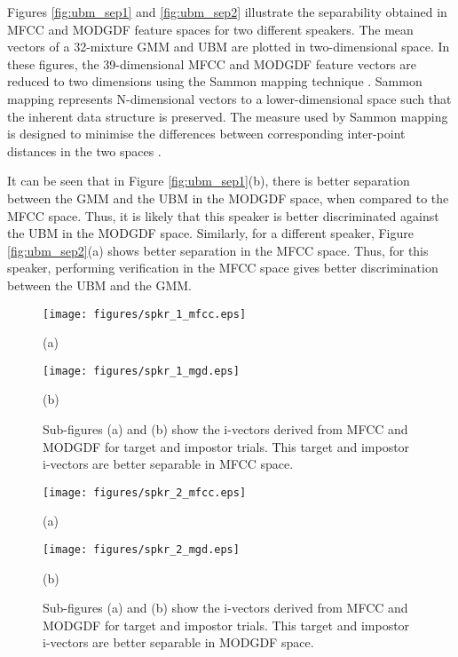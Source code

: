 \documentclass{article}
\begin{document}
Figures \ref{fig:ubm_sep1} and \ref{fig:ubm_sep2} illustrate the
separability obtained in MFCC and MODGDF feature spaces for two different
speakers. The mean vectors of a 32-mixture GMM and UBM are plotted in
two-dimensional space. In these figures, the 39-dimensional MFCC and MODGDF
feature vectors are reduced to two dimensions using the Sammon mapping technique
\cite{sammon}. Sammon mapping represents N-dimensional vectors to a 
lower-dimensional space such that the inherent data structure is preserved. The measure
used by Sammon mapping is designed to minimise the differences between corresponding
inter-point distances in the two spaces \cite{sammon1}. 

It can be seen that in Figure \ref{fig:ubm_sep1}(b), there is  better separation
between the GMM and the UBM in the MODGDF space, when compared to the MFCC
space. Thus, it is likely that this speaker is better discriminated against the
UBM in the MODGDF space. Similarly, for a different speaker, Figure
\ref{fig:ubm_sep2}(a) shows better separation in the MFCC space. Thus, for this
speaker, performing verification in the MFCC space gives better discrimination
between the UBM and the GMM. 

\begin{figure}[h!tb]
\centering 
\begin{minipage}{0.5\textwidth}
\centering 
\texttt{[image: figures/spkr\_1\_mfcc.eps]}
\caption*{(a)}
\label{fig:subfig3}
\end{minipage}%
\begin{minipage}{0.5\textwidth}
\centering 
\texttt{[image: figures/spkr\_1\_mgd.eps]}
\caption*{(b)}
\label{fig:subfig4}
\end{minipage}
\caption{Sub-figures (a) and (b) show the i-vectors derived from MFCC
and MODGDF for target and impostor trials. This target and impostor
i-vectors are better separable in MFCC space.}
\label{fig:ivec_separation}
\end{figure}

\begin{figure}[h!tb]
\centering 
\begin{minipage}{0.5\textwidth}
\centering 
\texttt{[image: figures/spkr\_2\_mfcc.eps]}
\caption*{(a)}
\label{fig:subfig3}
\end{minipage}%
\begin{minipage}{0.5\textwidth}
\centering 
\texttt{[image: figures/spkr\_2\_mgd.eps]}
\caption*{(b)}
\label{fig:subfig4}
\end{minipage}
\caption{Sub-figures (a) and (b) show the i-vectors derived from MFCC
and MODGDF for target and impostor trials. This target and impostor
i-vectors are better separable in MODGDF space.}
\label{fig:ivec_separation}
\end{figure}
\end{document}
